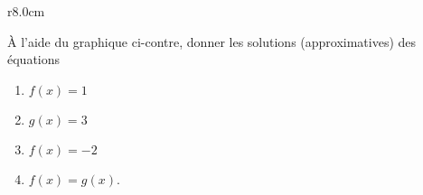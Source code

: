 
\begin{exercice}\label{exoSeconde-0070}

\begin{wrapfigure}{r}{8.0cm}
   \vspace{-1.5cm}        %
   \centering
   
\end{wrapfigure}

        À l'aide du graphique ci-contre, donner les solutions (approximatives) des équations
        \begin{enumerate}
            \item
                \( f(x)=1\)
            \item
                \( g(x)=3\)
            \item
                \( f(x)=-2\)
            \item
                $f(x)=g(x)$.
        \end{enumerate}


\end{exercice}
